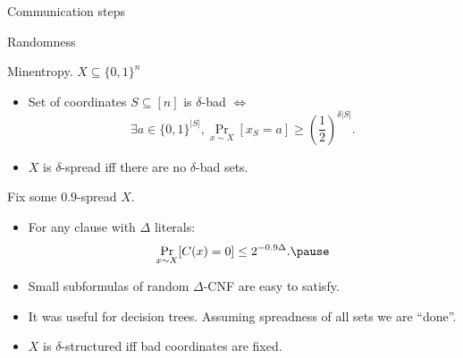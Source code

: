 \begin{frame}{Communication steps}

    \begin{center}
        
    \end{center}

\end{frame}

\begin{frame}{Randomness}

    \begin{center}
        
    \end{center}

\end{frame}

\begin{frame}{Minentropy. $X \subseteq \{0, 1\}^n$}

    \begin{itemize}
        \item Set of coordinates $S \subseteq [n]$ is $\delta$-bad
            $\Leftrightarrow$
            $$
                \exists a \in \{0, 1\}^{|S|},
                \Pr_{x \sim X}[x_{S} = a] \ge
                \left( \frac{1}{2} \right)^{\delta |S|}.
            $$
        \item $X$ is $\delta$-spread iff there are no $\delta$-bad
            sets.
    \end{itemize}

    \pause
    \vspace{0.5cm}
    Fix some $0.9$-spread $X$.
    \begin{itemize}
        \item For any clause with $\Delta$ literals:
            $$
                \Pr_{x \sim X}[C(x) = 0] \le 2^{-0.9 \Delta}.
                        \pause
            $$
        \item Small subformulas of random $\Delta$-CNF are easy to
            satisfy.
            \pause
        \item It was useful for decision trees. Assuming spreadness of
            all sets we are ``done''.
            \pause
        \item $X$ is $\delta$-structured iff bad coordinates are fixed.
    \end{itemize}

\end{frame}


